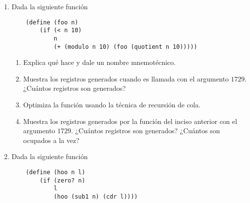\documentclass[letterpaper,11pt]{article}
\begin{document}
\begin{enumerate}
\begin{enumerate}
        Sale \texttt{concatena-listas-de-lista()}

        \item Optimiza la función usando la técnica de recursión de cola.

        \textsc{Solución:}
        \begin{verbatim}
        (define (concatena-listas l)
          (concatena-listas-tail l '()))

        (define (concatena-listas-tail l acc) 
          (if (empty? l)
              acc
              (concatena-listas-tail (cdr l) (append acc (car l)))))
        \end{verbatim}

        \item Muestra los registros generados por la función del inciso anterior
        con el argumento \texttt{'((1 2) (3 4) (4 6))}. ¿Cuántos registros son
        generados? ¿Cuántos son ocupados a la vez?
    \end{enumerate}

    \item Dada la siguiente función 
    \begin{verbatim}
    (define (foo n)
        (if (< n 10)
            n
            (+ (modulo n 10) (foo (quotient n 10)))))
    \end{verbatim}

    \begin{enumerate}
        \item Explica qué hace y dale un nombre mnemotécnico.

        \item Muestra los registros generados cuando es llamada con el 
        argumento $1729$. ¿Cuántos registros son generados?

        \item Optimiza la función usando la técnica de recursión de cola.

        \item Muestra los registros generados por la función del inciso anterior 
        con el argumento $1729$. ¿Cuántos registros son generados? ¿Cuántos son 
        ocupados a la vez?
    \end{enumerate}

    \item Dada la siguiente función 
    \begin{verbatim}
    (define (hoo n l)
        (if (zero? n)
            l
            (hoo (sub1 n) (cdr l))))
    \end{verbatim}


\end{enumerate}
\end{document}
